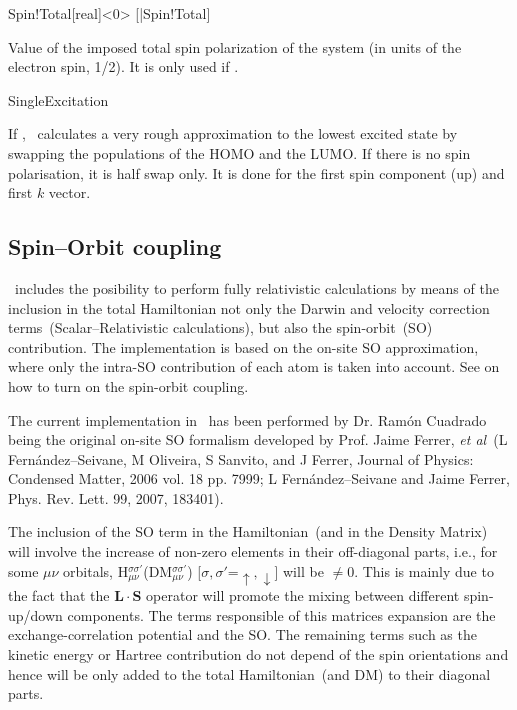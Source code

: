 \begin{fdfentry}{Spin!Total}[real]<$0$>
  [|Spin!Total]
  
  Value of the imposed total spin polarization of the system (in units
  of the electron spin, 1/2). It is only used if  \fdftrue.
  
\end{fdfentry}

\begin{fdflogicalF}{SingleExcitation}

  If \fdftrue, \siesta\ calculates a very rough approximation to the
  lowest excited state by swapping the populations of the HOMO and the
  LUMO. If there is no spin polarisation, it is half swap only.  It is
  done for the first spin component (up) and first $k$ vector.
  
\end{fdflogicalF}


\subsection{Spin--Orbit coupling}
\label{sec:spin-orbit}

\siesta\ includes the posibility to perform fully relativistic
calculations by means of the inclusion in the total Hamiltonian not
only the Darwin and velocity correction terms~(Scalar--Relativistic
calculations), but also the spin-orbit~(SO) contribution. The
implementation is based on the on-site SO approximation, where only
the intra-SO contribution of each atom is taken into account. See
 on how to turn on the spin-orbit coupling.

The current implementation in \siesta\ has been performed by
Dr. Ram\'on Cuadrado being the original on-site SO formalism developed
by Prof. Jaime Ferrer, \textit{et al}~(L Fern\'andez--Seivane, M
Oliveira, S Sanvito, and J Ferrer, Journal of Physics: Condensed
Matter, 2006 vol. 18 pp. 7999; L Fern\'andez--Seivane and Jaime
Ferrer, Phys. Rev. Lett. 99, 2007, 183401).

The inclusion of the SO term in the Hamiltonian~(and in the Density
Matrix) will involve the increase of non-zero elements in their
off-diagonal parts, i.e., for some $\mu\nu$ orbitals,
H$^{\sigma\sigma'}_{\mu\nu}$(DM$^{\sigma\sigma'}_{\mu\nu}$)
[$\sigma,\sigma'$=$\uparrow,\downarrow$] will be $\neq$0. This is
mainly due to the fact that the $\mathbf L\cdot\mathbf S$ operator
will promote the mixing between different spin-up/down components. The
terms responsible of this matrices expansion are the
exchange-correlation potential and the SO. The remaining terms such as
the kinetic energy or Hartree contribution do not depend of the spin
orientations and hence will be only added to the total
Hamiltonian~(and DM) to their diagonal parts.

